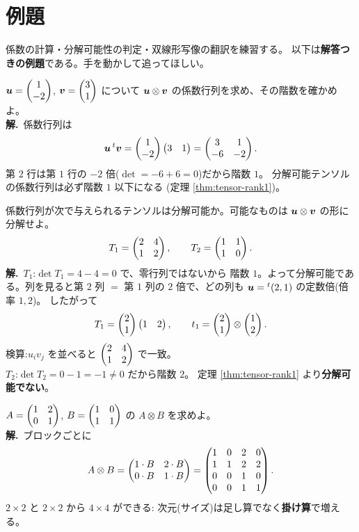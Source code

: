 \section{例題}

係数の計算・分解可能性の判定・双線形写像の翻訳を練習する。
以下は\textbf{解答つきの例題}である。手を動かして追ってほしい。

\begin{rei}[例題・基本(係数行列の計算)]\label{rei:tensor-coef}
$\bm{u} = \begin{pmatrix}1 \\ -2\end{pmatrix}$, $\bm{v} = \begin{pmatrix}3 \\ 1\end{pmatrix}$ について
$\bm{u} \otimes \bm{v}$ の係数行列を求め、その階数を確かめよ。\\
\textbf{解.}\ 係数行列は
\[
\bm{u}\,{}^t\bm{v} = \begin{pmatrix}1 \\ -2\end{pmatrix}\begin{pmatrix}3 & 1\end{pmatrix}
= \begin{pmatrix}3 & 1 \\ -6 & -2\end{pmatrix}.
\]
第 $2$ 行は第 $1$ 行の $-2$ 倍($\det = -6 + 6 = 0$)だから階数 $1$。
分解可能テンソルの係数行列は必ず階数 $1$ 以下になる
(定理 \ref{thm:tensor-rank1})。
\end{rei}

\begin{rei}[例題・基本(分解可能性の判定)]\label{rei:tensor-decomp}
係数行列が次で与えられるテンソルは分解可能か。可能なものは
$\bm{u} \otimes \bm{v}$ の形に分解せよ。
\[
T_1 = \begin{pmatrix}2 & 4 \\ 1 & 2\end{pmatrix}, \qquad T_2 = \begin{pmatrix}1 & 1 \\ 1 & 0\end{pmatrix}.
\]
\textbf{解.}\ $T_1$:$\det T_1 = 4 - 4 = 0$ で、零行列ではないから
階数 $1$。よって分解可能である。列を見ると第 $2$ 列 $=$ 第 $1$ 列の
$2$ 倍で、どの列も $\bm{u} = {}^t(2, 1)$ の定数倍(倍率 $1, 2$)。
したがって
\[
T_1 = \begin{pmatrix}2 \\ 1\end{pmatrix}\begin{pmatrix}1 & 2\end{pmatrix}, \qquad
t_1 = \begin{pmatrix}2 \\ 1\end{pmatrix} \otimes \begin{pmatrix}1 \\ 2\end{pmatrix}.
\]
検算:$u_i v_j$ を並べると $\begin{pmatrix}2 & 4 \\ 1 & 2\end{pmatrix}$ で一致。\\
$T_2$:$\det T_2 = 0 - 1 = -1 \neq 0$ だから階数 $2$。
定理 \ref{thm:tensor-rank1} より\textbf{分解可能でない}。
\end{rei}

\begin{rei}[例題・基本(クロネッカー積)]\label{rei:tensor-kron2}
$A = \begin{pmatrix}1 & 2 \\ 0 & 1\end{pmatrix}$, $B = \begin{pmatrix}1 & 0 \\ 1 & 1\end{pmatrix}$ の
$A \otimes B$ を求めよ。\\
\textbf{解.}\ ブロックごとに
\[
A \otimes B = \begin{pmatrix}1 \cdot B & 2 \cdot B \\ 0 \cdot B & 1 \cdot B\end{pmatrix}
= \begin{pmatrix}1 & 0 & 2 & 0 \\ 1 & 1 & 2 & 2 \\
0 & 0 & 1 & 0 \\ 0 & 0 & 1 & 1\end{pmatrix}.
\]
$2 \times 2$ と $2 \times 2$ から $4 \times 4$ ができる:
次元(サイズ)は足し算でなく\textbf{掛け算}で増える。
\end{rei}

